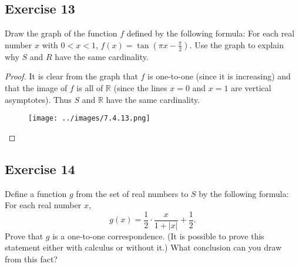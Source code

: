 \documentclass[14pt]{extarticle}
\newcommand{\R}{\mathbb{R}}
\begin{document}
\subsection{Exercise 13}
Draw the graph of the function $f$ defined by the following formula: For each real number $x$ with \(0 < x < 1\),
\(f(x) = \tan(\pi x - \frac{\pi}{2})\). Use the graph to explain why $S$ and $R$ have the same cardinality.

\begin{proof}
    It is clear from the graph that $f$ is one-to-one (since it is increasing) and that the image of $f$ is all of $\R$
    (since the lines $x = 0$ and $x = 1$ are vertical asymptotes). Thus $S$ and $\R$ have the same cardinality.

    \begin{figure}[ht!]
        \centering
        \texttt{[image: ../images/7.4.13.png]}
    \end{figure}
\end{proof}

\subsection{Exercise 14}
Define a function $g$ from the set of real numbers to $S$ by the following formula: For each real number $x$,
\[
    g(x) = \frac{1}{2} \cdot \frac{x}{1 + |x|} + \frac{1}{2}.
\]
Prove that $g$ is a one-to-one correspondence. (It is possible to prove this statement either with calculus or
without it.) What conclusion can you draw from this fact?
\end{document}
